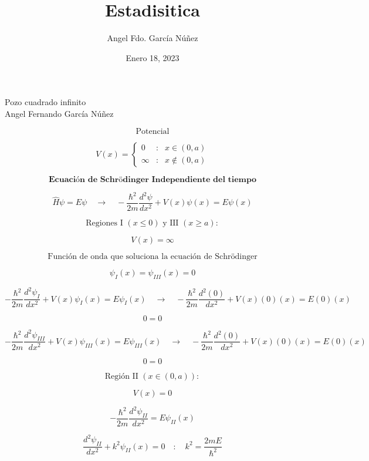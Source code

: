 \documentclass[10pt,a4papper]{article}
\author{Angel Fdo. García Núñez}
\date{Enero 18, 2023}
\title{Estadisitica}
\begin{document}
\Huge
Pozo cuadrado infinito\\

Angel Fernando García Núñez


\Large
\newpage
\[\text{Potencial}\]

\[V(x)=
\left\{\begin{array}{lll}
0 & : & x\in(0,a)\\
\infty & : & x\not\in(0,a)
\end{array}\]

\begin{center}
\end{center}

\[\textbf{Ecuación de Schrödinger Independiente del tiempo}\]

\[\hat H\psi=E\psi\quad\to\quad
-\frac{\hbar^2}{2m}\frac{d^2\psi}{dx^2}+V(x)\psi(x)=E\psi(x)\]

\newpage
\[\text{Regiones I $(x\leq 0)$ y III $(x\geq a)$}:\]

\[V(x)=\infty\]

\[\text{Función de onda que soluciona la ecuación de Schrödinger}\]

\[\psi_I(x)=\psi_{III}(x)=0\]

\[-\frac{\hbar^2}{2m}\frac{d^2\psi_I}{dx^2}+V(x)\psi_I(x)=E\psi_I(x)\quad\to\quad
-\frac{\hbar^2}{2m}\frac{d^2(0)}{dx^2}+V(x)(0)(x)=E(0)(x)\]

\[\boxed{0=0}\]

\[-\frac{\hbar^2}{2m}\frac{d^2\psi_{III}}{dx^2}+V(x)\psi_{III}(x)=E\psi_{III}(x)\quad\to\quad
-\frac{\hbar^2}{2m}\frac{d^2(0)}{dx^2}+V(x)(0)(x)=E(0)(x)\]

\[\boxed{0=0}\]

\newpage
\[\text{Región II $(x\in(0,a))$}:\]

\[V(x)=0\]

\[-\frac{\hbar^2}{2m}\frac{d^2\psi_{II}}{dx^2}=E\psi_{II}(x)\]

\[\frac{d^2\psi_{II}}{dx^2}+k^2\psi_{II}(x)=0\quad:\quad k^2=\frac{2mE}{\hbar^2}\]\\
\end{document}
